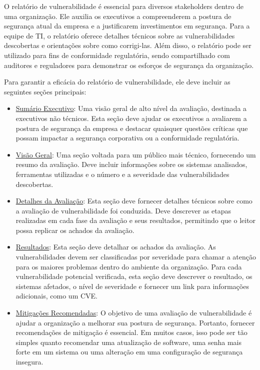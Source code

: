    O relatório de vulnerabilidade é essencial para diversos stakeholders dentro de uma organização. Ele auxilia os executivos a compreenderem a postura de segurança atual da empresa e a justificarem investimentos em segurança. Para a equipe de TI, o relatório oferece detalhes técnicos sobre as vulnerabilidades descobertas e orientações sobre como corrigi-las. Além disso, o relatório pode ser utilizado para fins de conformidade regulatória, sendo compartilhado com auditores e reguladores para demonstrar os esforços de segurança da organização.

    Para garantir a eficácia do relatório de vulnerabilidade, ele deve incluir as seguintes seções principais:

    \begin{itemize}
        \item \underline{Sumário Executivo}: Uma visão geral de alto nível da avaliação, destinada a executivos não técnicos. Esta seção deve ajudar os executivos a avaliarem a postura de segurança da empresa e destacar quaisquer questões críticas que possam impactar a segurança corporativa ou a conformidade regulatória.
        \item \underline{Visão Geral}: Uma seção voltada para um público mais técnico, fornecendo um resumo da avaliação. Deve incluir informações sobre os sistemas analisados, ferramentas utilizadas e o número e a severidade das vulnerabilidades descobertas.
        \item \underline{Detalhes da Avaliação}: Esta seção deve fornecer detalhes técnicos sobre como a avaliação de vulnerabilidade foi conduzida. Deve descrever as etapas realizadas em cada fase da avaliação e seus resultados, permitindo que o leitor possa replicar os achados da avaliação.
        \item \underline{Resultados}: Esta seção deve detalhar os achados da avaliação. As vulnerabilidades devem ser classificadas por severidade para chamar a atenção para os maiores problemas dentro do ambiente da organização. Para cada vulnerabilidade potencial verificada, esta seção deve descrever o resultado, os sistemas afetados, o nível de severidade e fornecer um link para informações adicionais, como um CVE.
        \item \underline{Mitigações Recomendadas}: O objetivo de uma avaliação de vulnerabilidade é ajudar a organização a melhorar sua postura de segurança. Portanto, fornecer recomendações de mitigação é essencial. Em muitos casos, isso pode ser tão simples quanto recomendar uma atualização de software, uma senha mais forte em um sistema ou uma alteração em uma configuração de segurança insegura.
    \end{itemize}

